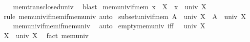 \begin{isabellebody}
%
\isadelimproof
\ \ %
\endisadelimproof
%
\isatagproof
{}\isamarkupfalse%
\ mem{\isacharunderscore}{\kern0pt}trans{\isacharunderscore}{\kern0pt}closed{\isacharunderscore}{\kern0pt}univ\ \isamarkupfalse%
\ blast%
\endisatagproof
{\isafoldproof}%
%
\isadelimproof
\isanewline
%
\endisadelimproof
\isanewline
{}\isamarkupfalse%
\ mem{\isacharunderscore}{\kern0pt}univ{\isacharunderscore}{\kern0pt}if{\isacharunderscore}{\kern0pt}mem{\isacharcolon}{\kern0pt}\ {\isachardoublequoteopen}x\ {\isasymin}\ X\ {\isasymLongrightarrow}\ x\ {\isasymin}\ univ\ X{\isachardoublequoteclose}\isanewline
%
\isadelimproof
\ \ %
\endisadelimproof
%
\isatagproof
{}\isamarkupfalse%
\ {\isacharparenleft}{\kern0pt}rule\ mem{\isacharunderscore}{\kern0pt}univ{\isacharunderscore}{\kern0pt}if{\isacharunderscore}{\kern0pt}mem{\isacharunderscore}{\kern0pt}if{\isacharunderscore}{\kern0pt}mem{\isacharunderscore}{\kern0pt}univ{\isacharparenright}{\kern0pt}\ auto%
\endisatagproof
{\isafoldproof}%
%
\isadelimproof
\isanewline
%
\endisadelimproof
\isanewline
{}\isamarkupfalse%
\ subset{\isacharunderscore}{\kern0pt}univ{\isacharunderscore}{\kern0pt}if{\isacharunderscore}{\kern0pt}mem{\isacharcolon}{\kern0pt}\ {\isachardoublequoteopen}A\ {\isasymin}\ univ\ X\ {\isasymLongrightarrow}\ A\ {\isasymsubseteq}\ univ\ X{\isachardoublequoteclose}\isanewline
%
\isadelimproof
\ \ %
\endisadelimproof
%
\isatagproof
{}\isamarkupfalse%
\ mem{\isacharunderscore}{\kern0pt}univ{\isacharunderscore}{\kern0pt}if{\isacharunderscore}{\kern0pt}mem{\isacharunderscore}{\kern0pt}if{\isacharunderscore}{\kern0pt}mem{\isacharunderscore}{\kern0pt}univ\ \isamarkupfalse%
\ auto%
\endisatagproof
{\isafoldproof}%
%
\isadelimproof
\isanewline
%
\endisadelimproof
\isanewline
{}\isamarkupfalse%
\ empty{\isacharunderscore}{\kern0pt}mem{\isacharunderscore}{\kern0pt}univ\ {\isacharbrackleft}{\kern0pt}iff{\isacharbrackright}{\kern0pt}{\isacharcolon}{\kern0pt}\ {\isachardoublequoteopen}{\isacharbraceleft}{\kern0pt}{\isacharbraceright}{\kern0pt}\ {\isasymin}\ univ\ X{\isachardoublequoteclose}\isanewline
%
\isadelimproof
%
\endisadelimproof
%
\isatagproof
{}\isamarkupfalse%
\ {\isacharminus}{\kern0pt}\isanewline
\ \ \isamarkupfalse%
\ {\isachardoublequoteopen}X\ {\isasymin}\ univ\ X{\isachardoublequoteclose}\ \isamarkupfalse%
\ {\isacharparenleft}{\kern0pt}fact\ mem{\isacharunderscore}{\kern0pt}univ{\isacharparenright}{\kern0pt}\isanewline
\ \ \isamarkupfalse%

\end{isabellebody}
